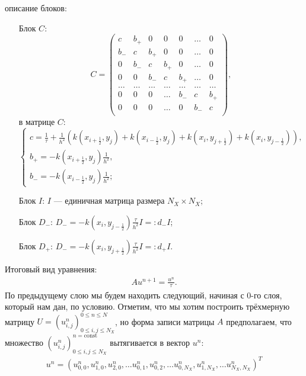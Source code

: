 \documentclass[14pt,a4paper]{extarticle}
\newcommand{\1}{\mathbbm{1}}
\begin{document}
описание блоков:
\begin{enumerate}
    \item[Блок $C$:] $$C = \begin{pmatrix}
    c   & b_+ & 0     & 0   & 0   & \ldots & 0 \\
    b_- & c   & b_+   & 0   & 0   & \ldots & 0 \\
    0   & b_- & c     & b_+ & 0   & \ldots & 0 \\
    0   & 0   & b_-   & c   & b_+ & \ldots & 0 \\
    \ldots & \ldots & \ldots & \ldots & \ldots & \ldots & \ldots \\
    0   & 0   & 0    & \ldots & b_- & c & b_+ \\
    0   & 0   & 0     & \ldots & 0 & b_- & c \\
\end{pmatrix},
$$
в матрице $C$:
$$
\left\{\begin{array}{l}
 c = \frac{1}{\tau} + \frac{1}{h^2} \left(k(x_{i + \frac{1}{2}}, y_{j}) + k(x_{i - \frac{1}{2}}, y_{j}) + k(x_{i}, y_{j+ \frac{1}{2}}) + k(x_{i}, y_{j- \frac{1}{2}})\right), \\
 b_+ = -k(x_{i + \frac{1}{2}}, y_j) \frac{1}{h^2}, \\
 b_- = -k(x_{i - \frac{1}{2}}, y_j) \frac{1}{h^2};
\end{array}\right. 
$$
\item[Блок $I$:] $I$ --- единичная матрица размера $N_X\times N_X$; 
\item[Блок $D_-$:] $D_- = -k(x_{i}, y_{j- \frac{1}{2}}) \frac{\tau}{h^2} I =: d_- I$;
\item[Блок $D_+$:] $D_- = -k(x_{i}, y_{j+ \frac{1}{2}}) \frac{\tau}{h^2} I =: d_+ I$.
\end{enumerate}
Итоговый вид уравнения:
\begin{align*}
    A u^{n+1} = \frac{u^n}{\tau}. 
\end{align*}
По предыдущему слою мы будем находить следующий, начиная с 0-го слоя, который нам дан, по условию. Отметим, что мы хотим построить трёхмерную матрицу $U = (u^n_{i, j})^{0 \leq n \leq N} _{0 \leq i, j \leq N_X}$, но форма записи матрицы $A$ предполагаем, что множество $(u^n_{i, j})^{n=\text{const}} _{0 \leq i, j \leq N_X}$ вытягивается в вектор $u^{n}$:
    \begin{align*}
        u^n = (u^n_{0,0}, u^n_{1,0}, u^n_{2,0}, \ldots u^n_{0, 1}, u^n_{0, 2}, \ldots u^n_{0, N_X}, u^n_{1, N_X}, \ldots u^n_{N_X, N_X})^T
    \end{align*}
\end{document}
